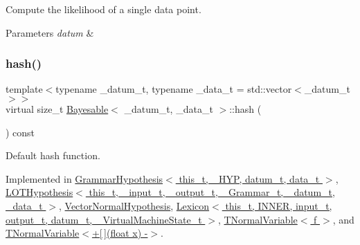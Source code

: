 Compute the likelihood of a single data point. 


\begin{DoxyParams}{Parameters}
{\em datum} & \\
\hline
\end{DoxyParams}
\mbox{\label{class_bayesable_a26f6d55e7526ebd897cbb27c757b611b}} 
\subsubsection{\texorpdfstring{hash()}{hash()}}
{\footnotesize\ttfamily template$<$typename \+\_\+datum\+\_\+t, typename \+\_\+data\+\_\+t = std\+::vector$<$\+\_\+datum\+\_\+t$>$$>$ \\
virtual size\+\_\+t \hyperlink{class_bayesable}{Bayesable}$<$ \+\_\+datum\+\_\+t, \+\_\+data\+\_\+t $>$\+::hash (\begin{DoxyParamCaption}{ }\end{DoxyParamCaption}) const\hspace{0.3cm}{\ttfamily [pure virtual]}}



Default hash function. 



Implemented in \hyperlink{class_grammar_hypothesis_aeb9e858426a5ef273b87eafd8b2a5cd6}{Grammar\+Hypothesis$<$ this\+\_\+t, \+\_\+\+H\+Y\+P, datum\+\_\+t, data\+\_\+t $>$}, \hyperlink{class_l_o_t_hypothesis_a1157a3217d41d4c06105f1166d8c1808}{L\+O\+T\+Hypothesis$<$ this\+\_\+t, \+\_\+input\+\_\+t, \+\_\+output\+\_\+t, \+\_\+\+Grammar\+\_\+t, \+\_\+datum\+\_\+t, \+\_\+data\+\_\+t $>$}, \hyperlink{class_vector_normal_hypothesis_a77173d453fd983deb13ae2c7bc4bfbaa}{Vector\+Normal\+Hypothesis}, \hyperlink{class_lexicon_a53dc77a82e9cb0312ef3de53f0a65b0a}{Lexicon$<$ this\+\_\+t, I\+N\+N\+E\+R, input\+\_\+t, output\+\_\+t, datum\+\_\+t, \+\_\+\+Virtual\+Machine\+State\+\_\+t $>$}, \hyperlink{class_t_normal_variable_aed121b256f5555f36e65e3a30156cfed}{T\+Normal\+Variable$<$ f $>$}, and \hyperlink{class_t_normal_variable_aed121b256f5555f36e65e3a30156cfed}{T\+Normal\+Variable$<$+\mbox{[}$\,$\mbox{]}(float x) -\/$>$}.

\mbox{\label{class_bayesable_ac356e7e5b11c266b8442064186dbe89d}} 
